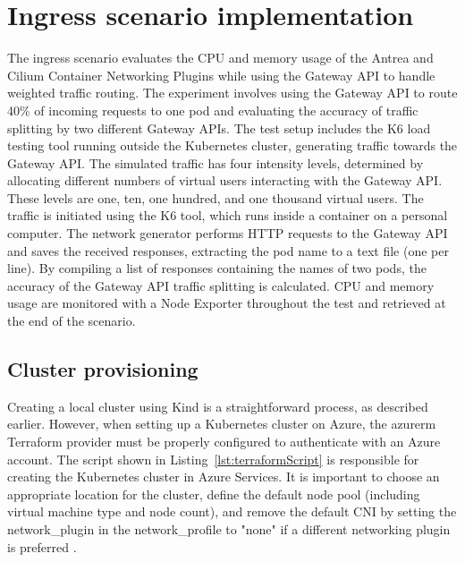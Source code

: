 
\section{Ingress scenario implementation}
\label{sec:ingressImpl}

The ingress scenario evaluates the CPU and memory usage of the Antrea and Cilium Container Networking Plugins while using the Gateway API to handle weighted traffic routing. The experiment involves using the Gateway API to route 40\% of incoming requests to one pod and evaluating the accuracy of traffic splitting by two different Gateway APIs. The test setup includes the K6 load testing tool running outside the Kubernetes cluster, generating traffic towards the Gateway API. The simulated traffic has four intensity levels, determined by allocating different numbers of virtual users interacting with the Gateway API. These levels are one, ten, one hundred, and one thousand virtual users. The traffic is initiated using the K6 tool, which runs inside a container on a personal computer. The network generator performs HTTP requests to the Gateway API and saves the received responses, extracting the pod name to a text file (one per line). By compiling a list of responses containing the names of two pods, the accuracy of the Gateway API traffic splitting is calculated. CPU and memory usage are monitored with a Node Exporter throughout the test and retrieved at the end of the scenario.


\subsection{Cluster provisioning}
\label{sec:clusterProvisioning}

Creating a local cluster using Kind is a straightforward process, as described earlier. However, when setting up a Kubernetes cluster on Azure, the azurerm Terraform provider must be properly configured to authenticate with an Azure account. The script shown in Listing~\ref{lst:terraformScript} is responsible for creating the Kubernetes cluster in Azure Services. It is important to choose an appropriate location for the cluster, define the default node pool (including virtual machine type and node count), and remove the default CNI by setting the network\_plugin in the network\_profile to "none" if a different networking plugin is preferred \cite{AKS}.

